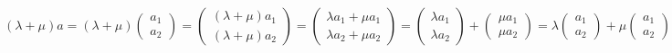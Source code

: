 $(\lambda +\mu) a = (\lambda + \mu)\begin{pmatrix}a_{1} \\ a_{2} \end{pmatrix} = \begin{pmatrix} (\lambda + \mu)  a_{1} \\ (\lambda + \mu)  a_{2}\end{pmatrix}=\begin{pmatrix}\lambda  a_{1}+\mu a_{1} \\ \lambda  a_{2} + \mu  a_{2} \end{pmatrix}=\begin{pmatrix} \lambda  a_{1} \\ \lambda  a_{2}\end{pmatrix} + \begin{pmatrix} \mu  a_{1} \\ \mu  a_{2}\end{pmatrix} = \lambda  \begin{pmatrix}a_{1} \\ a_{2}\end{pmatrix} + \mu \begin{pmatrix}a_{1} \\ a_{2}\end{pmatrix} =\lambda a + \mu a$
%
%
%
